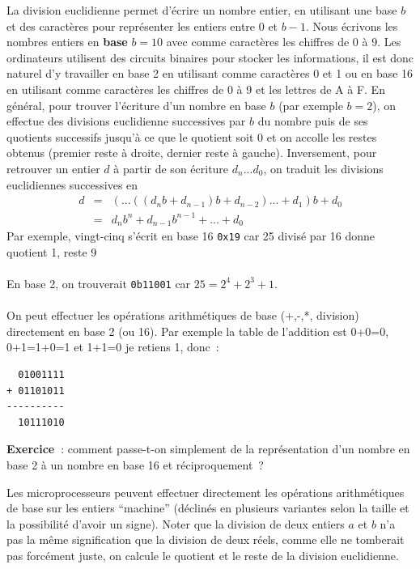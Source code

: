 \documentclass[a4paper,11pt]{article}
\begin{document}
\begin{giacjshere}
La division euclidienne permet d'écrire un nombre entier, en utilisant
une base $b$ et des caractères pour représenter les entiers
entre 0 et $b-1$. Nous \'ecrivons les nombres entiers en {\bf base} $b=10$
avec comme caractères les chiffres de 0 à 9.
Les ordinateurs utilisent des circuits binaires pour stocker
les informations, il est donc naturel d'y travailler en base 2 
en utilisant comme caractères 0 et 1 ou en base 16 en utilisant
comme caractères les chiffres de 0 à 9 et les lettres de A à F.
En g\'en\'eral, pour trouver l'\'ecriture d'un nombre en base $b$ (par
exemple $b=2$), 
on effectue des divisions euclidienne successives par $b$ du nombre puis
de ses quotients successifs jusqu'\`a ce que le quotient soit 0 et on
accolle les restes obtenus (premier reste \`a droite, dernier
reste \`a gauche).
Inversement, pour retrouver un entier $d$ \`a partir
de son \'ecriture $d_n...d_0$, on traduit les divisions euclidiennes 
successives en 
\begin{eqnarray*}
 d &=&( ... ((d_n b +d_{n-1})b + d_{n-2})...+d_1)b+d_0\\
&=& d_n b^n + d_{n-1} b^{n-1} + ... + d_0
\end{eqnarray*}
Par exemple, vingt-cinq s'\'ecrit en base 16 \verb|0x19| car 25 divis\'e
par 16 donne quotient 1, reste 9\\
\\
En base 2, on trouverait \verb|0b11001| car $25=2^4+2^3+1$.\\
\\
On peut effectuer les op\'erations arithm\'etiques de base 
(+,-,*, division) directement en base 2 (ou 16). Par exemple
la table de l'addition est 0+0=0, 0+1=1+0=1 et 1+1=0 je retiens 1,
donc~:
\begin{verbatim}
  01001111
+ 01101011
----------
  10111010
\end{verbatim}

{\bf Exercice~}: 
comment passe-t-on simplement de la représentation d'un nombre en
base 2 à un nombre en base 16 et réciproquement~?

Les microprocesseurs peuvent effectuer directement
les opérations arithmétiques de base sur les entiers ``machine''
(d\'eclin\'es en plusieurs variantes selon la taille et la
possibilit\'e d'avoir un signe). Noter que la division de deux
entiers $a$ et $b$ n'a pas la même signification que la division de deux
réels, comme elle ne tomberait pas forcément juste, 
on calcule le quotient et le reste de la division euclidienne. 


\end{giacjshere}
\end{document}
